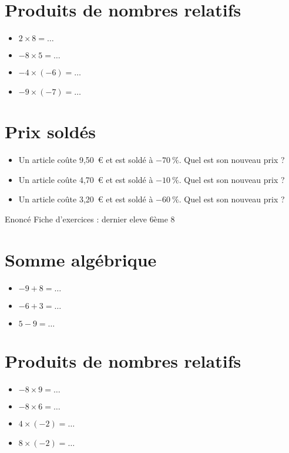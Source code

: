 \documentclass[a4paper,11pt,fleqn]{article}
\begin{document}
\section{Produits de nombres relatifs}
\begin{itemize}

  \item $2\times8=\ldots$
  \item $-8\times5=\ldots$
  \item $-4\times(-6)=\ldots$
  \item $-9\times(-7)=\ldots$
\end{itemize}


\section{Prix soldés}
\begin{itemize}

  \item Un article coûte 9,50~€ et est soldé à $-70~\%$. Quel est son nouveau prix ?
  \item Un article coûte 4,70~€ et est soldé à $-10~\%$. Quel est son nouveau prix ?
  \item Un article coûte 3,20~€ et est soldé à $-60~\%$. Quel est son nouveau prix ?
\end{itemize}
\newpage
\setcounter{exo}{0}
\setcounter{section}{0}
{Enoncé} \hfill {\huge Fiche d'exercices  : dernier eleve} \hfill {6ème 8}

\section{Somme algébrique}
\begin{itemize}

  \item $-9 +8=\ldots$
  \item $-6 +3=\ldots$
  \item $5 -9=\ldots$
\end{itemize}


\section{Produits de nombres relatifs}
\begin{itemize}

  \item $-8\times9=\ldots$
  \item $-8\times6=\ldots$
  \item $4\times(-2)=\ldots$
  \item $8\times(-2)=\ldots$
\end{itemize}
\end{document}

